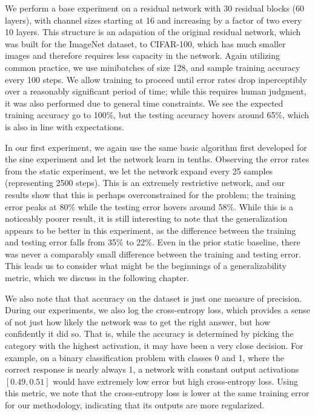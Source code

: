 We perform a base experiment on a residual network with 30 residual blocks (60 layers), with channel sizes starting at 16 and increasing by a factor of two every 10 layers.
This structure is an adapation of the original residual network, which was built for the ImageNet dataset, to CIFAR-100, which has much smaller images and therefore requires less capacity in the network.
Again utilizing common practice, we use minibatches of size 128, and sample training accuracy every 100 steps.
We allow training to proceed until error rates drop inperceptibly over a reasonably significant period of time; while this requires human judgment, it was also performed due to general time constraints.
We see the expected training accuracy go to 100\%, but the testing accuracy hovers around 65\%, which is also in line with expectations.

In our first experiment, we again use the same basic algorithm first developed for the sine experiment and let the network learn in tenths.
Observing the error rates from the static experiment, we let the network expand every 25 samples (representing 2500 steps).
This is an extremely restrictive network, and our results show that this is perhaps overconstrained for the problem; the training error peaks at 80\% while the testing error hovers around 58\%.
While this is a noticeably poorer result, it is still interesting to note that the generalization appears to be better in this experiment, as the difference between the training and testing error falls from 35\% to 22\%.
Even in the prior static baseline, there was never a comparably small difference between the training and testing error.
This leads us to consider what might be the beginnings of a generalizability metric, which we discuss in the following chapter.

We also note that that accuracy on the dataset is just one measure of precision.
During our experiments, we also log the cross-entropy loss, which provides a sense of not just how likely the network was to get the right answer, but how confidently it did so.
That is, while the accuracy is determined by picking the category with the highest activation, it may have been a very close decision.
For example, on a binary classification problem with classes 0 and 1, where the correct response is nearly always 1, a network with constant output activations $[0.49, 0.51]$ would have extremely low error but high cross-entropy loss.
Using this metric, we note that the cross-entropy loss is lower at the same training error for our methodology, indicating that its outputs are more regularized.

